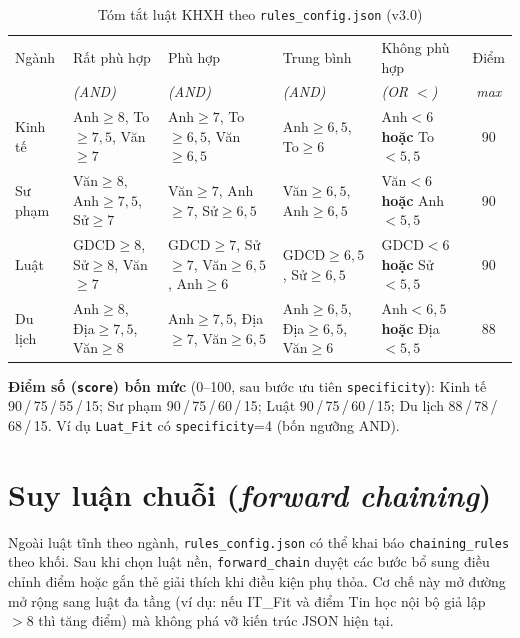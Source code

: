 \begin{table}[!htbp]
\centering
\caption{Tóm tắt luật KHXH theo \texttt{rules\_config.json} (v3.0)}
\label{tab:khxhrules}
\footnotesize
\setlength{\tabcolsep}{3pt}
\begin{tabular}{p{1.9cm}p{2.35cm}p{2.35cm}p{2.1cm}p{2.05cm}c}
\toprule
Ngành & Rất phù hợp & Phù hợp & Trung bình & Không phù hợp & Điểm \\
 & \textit{(AND)} & \textit{(AND)} & \textit{(AND)} & \textit{(OR $<$)} & \textit{max} \\
\midrule
Kinh tế &
Anh$\geq8$, To$\geq7{,}5$, Văn$\geq7$ &
Anh$\geq7$, To$\geq6{,}5$, Văn$\geq6{,}5$ &
Anh$\geq6{,}5$, To$\geq6$ &
Anh$<6$ \textbf{hoặc} To$<5{,}5$ & 90 \\
\addlinespace[2pt]
Sư phạm &
Văn$\geq8$, Anh$\geq7{,}5$, Sử$\geq7$ &
Văn$\geq7$, Anh$\geq7$, Sử$\geq6{,}5$ &
Văn$\geq6{,}5$, Anh$\geq6{,}5$ &
Văn$<6$ \textbf{hoặc} Anh$<5{,}5$ & 90 \\
\addlinespace[2pt]
Luật &
GDCD$\geq8$, Sử$\geq8$, Văn$\geq7$ &
GDCD$\geq7$, Sử$\geq7$, Văn$\geq6{,}5$, Anh$\geq6$ &
GDCD$\geq6{,}5$, Sử$\geq6{,}5$ &
GDCD$<6$ \textbf{hoặc} Sử$<5{,}5$ & 90 \\
\addlinespace[2pt]
Du lịch &
Anh$\geq8$, Địa$\geq7{,}5$, Văn$\geq8$ &
Anh$\geq7{,}5$, Địa$\geq7$, Văn$\geq6{,}5$ &
Anh$\geq6{,}5$, Địa$\geq6{,}5$, Văn$\geq6$ &
Anh$<6{,}5$ \textbf{hoặc} Địa$<5{,}5$ & 88 \\
\bottomrule
\end{tabular}
\end{table}

\noindent\textbf{Điểm số (\texttt{score}) bốn mức} (0--100, sau bước ưu tiên \texttt{specificity}): Kinh tế 90\,/\,75\,/\,55\,/\,15; Sư phạm 90\,/\,75\,/\,60\,/\,15; Luật 90\,/\,75\,/\,60\,/\,15; Du lịch 88\,/\,78\,/\,68\,/\,15. Ví dụ \texttt{Luat\_Fit} có \texttt{specificity}=4 (bốn ngưỡng AND).
\FloatBarrier

\section{Suy luận chuỗi (\textit{forward chaining})}
Ngoài luật tĩnh theo ngành, \texttt{rules\_config.json} có thể khai báo \texttt{chaining\_rules} theo khối. Sau khi chọn luật nền, \texttt{forward\_chain} duyệt các bước bổ sung điều chỉnh điểm hoặc gắn thẻ giải thích khi điều kiện phụ thỏa. Cơ chế này mở đường mở rộng sang luật đa tầng (ví dụ: nếu IT\_Fit và điểm Tin học nội bộ giả lập $>8$ thì tăng điểm) mà không phá vỡ kiến trúc JSON hiện tại.

